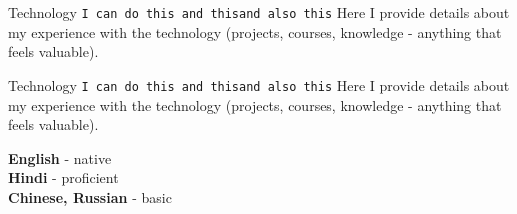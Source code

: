 \documentclass[9pt]{developercv} %
\begin{document}
\begin{tcolorbox}[]
\begin{detentrylist}
		\detentry
		{Technology} %
		{\texttt{I can do this }\slashsep\texttt{and this}\slashsep\texttt{and also this}} %
		{Here I provide details about my experience with the technology (projects, courses, knowledge - anything that feels valuable).} %
		
		\detentry
		{Technology} %
		{\texttt{I can do this }\slashsep\texttt{and this}\slashsep\texttt{and also this}} %
		{Here I provide details about my experience with the technology (projects, courses, knowledge - anything that feels valuable).} %
				
\end{detentrylist}

%
%
%

\begin{tcolorbox}[colback=primary, 
			colframe=secondary_dark,
			width=\linewidth,
			]

\begin{minipage}[t]{0.3\textwidth}
	\vspace{-\baselineskip} %

	
	\textbf{English} - native\\
	\textbf{Hindi} - proficient\\
	\textbf{Chinese, Russian} - basic\\
\end{minipage}
\hfill
\begin{minipage}[t]{0.3\textwidth}
	\vspace{-\baselineskip} %
	

\end{minipage}
\end{tcolorbox}
\end{tcolorbox}
\end{document}

